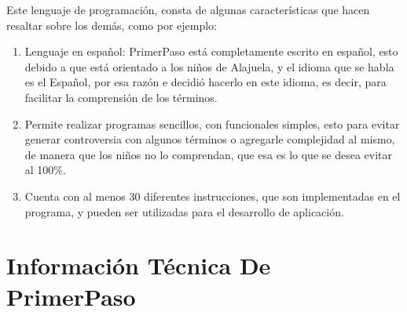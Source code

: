 \documentclass[%
 aip,
 jmp,%
 amsmath,amssymb,
 reprint,%
]{revtex4-1}
\begin{document}
Este lenguaje de programación, consta de algunas características que hacen resaltar sobre los demás, como por ejemplo:
\begin{enumerate}
\item Lenguaje en español: PrimerPaso está completamente escrito en español, esto debido a que está orientado a los niños de Alajuela, y el idioma que se habla es el Español, por esa razón e decidió hacerlo en este idioma, es decir, para facilitar la comprensión de los términos.
\item Permite realizar programas sencillos, con funcionales simples, esto para evitar generar controversia con algunos términos o agregarle complejidad al mismo, de manera que los niños no lo comprendan, que esa es lo que se desea evitar al 100\%.
\item Cuenta con al menos 30 diferentes instrucciones, que son implementadas en el programa, y pueden ser utilizadas para el desarrollo de aplicación. 
\end{enumerate}

\section{\label{sec:level1} Información Técnica De PrimerPaso}
\end{document}
